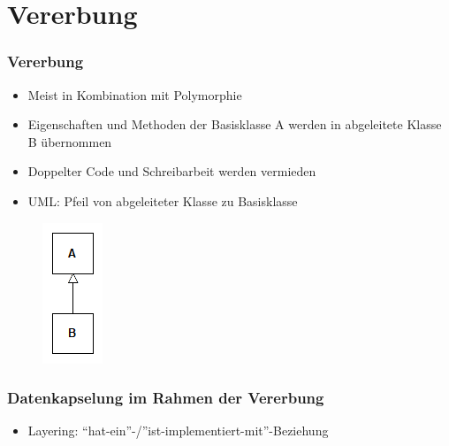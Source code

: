 \section{Vererbung}

{
\begin{frame}
	\frametitle{Vererbung}
	\begin{itemize}
		\item Meist in Kombination mit Polymorphie
		\item Eigenschaften und Methoden der Basisklasse A werden in abgeleitete Klasse B übernommen
		\item Doppelter Code und Schreibarbeit werden vermieden
		\item UML: Pfeil von abgeleiteter Klasse zu Basisklasse
	\end{itemize}
	\begin{figure}[h]
		\includegraphics[scale=0.75]{vererbung/uml.png}
	\end{figure}
\end{frame}
}

{
\begin{frame}
	\frametitle{Datenkapselung im Rahmen der Vererbung}
	\begin{figure}[h]
		
	\end{figure}
	\begin{itemize}
		\item Layering: ``hat-ein''-/''ist-implementiert-mit''-Beziehung
	\end{itemize}
\end{frame}
}

